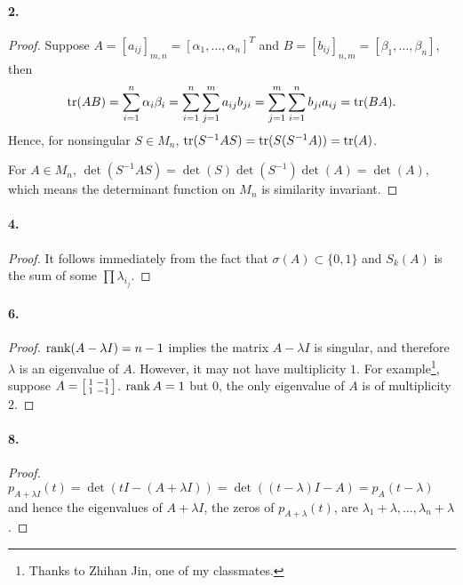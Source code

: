   \paragraph{2.}
  \begin{proof}
    Suppose $A = [a_{ij}]_{m,n} = [\alpha_1,\dots,\alpha_n]^T$ and $B = 
    [b_{ij}]_{n,m} = [\beta_1,\dots,\beta_n]$, then
    \[
      \operatorname{tr}(AB)=\sum_{i=1}^n\alpha_i\beta_i
      =\sum_{i=1}^n\sum_{j=1}^ma_{ij}b_{ji}
      =\sum_{j=1}^m\sum_{i=1}^nb_{ji}a_{ij}
      =\operatorname{tr}(BA).
    \]
    Hence, for nonsingular $S\in M_n$, $\operatorname{tr}(S^{-1}AS)=\operatorname{tr}(S(S^{-1}A)) = \operatorname{tr}(A)$.
    \par For $A\in M_n$, $\det(S^{-1}AS) = \det(S)\det(S^{-1})\det(A)=\det(A)$,
    which means the determinant function on $M_n$ is similarity invariant.
  \end{proof}

  \paragraph{4.}
  \begin{proof}
    It follows immediately from the fact that $\sigma(A)\subset\{0, 1\}$ and 
    $S_k(A)$ is the sum of some $\prod\lambda_{i_j}$. 
  \end{proof}

  \paragraph{6.}
  \begin{proof}
    $\operatorname{rank}(A-\lambda I)=n-1$ implies the matrix $A-\lambda I$ is singular, and
    therefore $\lambda$ is an eigenvalue of $A$. However, it may not have 
    multiplicity $1$. For example\footnote{Thanks to Zhihan Jin, one of my 
    classmates.}, suppose $A=\begin{bsmallmatrix} 1 & -1 \\ 1 & -1 
    \end{bsmallmatrix}$. $\operatorname{rank} A = 1$ but $0$, the only eigenvalue of
    $A$ is of multiplicity $2$.
  \end{proof}

  \paragraph{8.}
  \begin{proof}
    $p_{A+\lambda I}(t)=\det(tI-(A+\lambda I))=\det((t-\lambda)I-A)=p_A(t-
    \lambda)$ and hence the eigenvalues of $A+\lambda I$, the zeros of $p_{A+
    \lambda}(t)$, are $\lambda_1+\lambda,\dots, \lambda_n+\lambda$.
  \end{proof}


